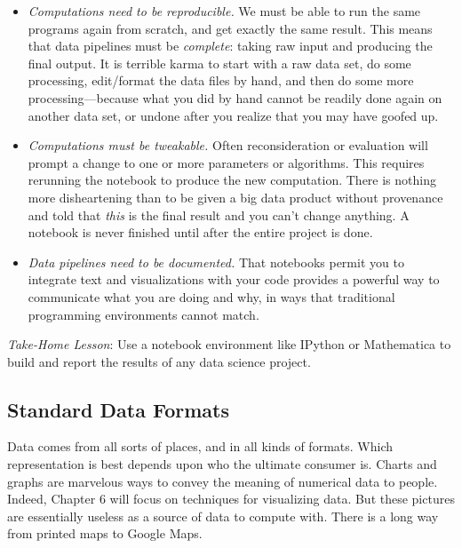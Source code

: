 \documentclass[10pt]{article}
\begin{document}
\begin{itemize}
  \item \textit{Computations need to be reproducible.} We must be able to run the same programs again from scratch, and get exactly the same result. This means that data pipelines must be \textit{complete}: taking raw input and producing the final output. It is terrible karma to start with a raw data set, do some processing, edit/format the data files by hand, and then do some more processing—because what you did by hand cannot be readily done again on another data set, or undone after you realize that you may have goofed up.
  \item \textit{Computations must be tweakable.} Often reconsideration or evaluation will prompt a change to one or more parameters or algorithms. This requires rerunning the notebook to produce the new computation. There is nothing more disheartening than to be given a big data product without provenance and told that \textit{this} is the final result and you can't change anything. A notebook is never finished until after the entire project is done.
  \item \textit{Data pipelines need to be documented.} That notebooks permit you to integrate text and visualizations with your code provides a powerful way to communicate what you are doing and why, in ways that traditional programming environments cannot match.
\end{itemize}

\textit{Take-Home Lesson}: Use a notebook environment like IPython or Mathematica to build and report the results of any data science project.

\subsection{Standard Data Formats}
Data comes from all sorts of places, and in all kinds of formats. Which representation is best depends upon who the ultimate consumer is. Charts and graphs are marvelous ways to convey the meaning of numerical data to people. Indeed, Chapter 6 will focus on techniques for visualizing data. But these pictures are essentially useless as a source of data to compute with. There is a long way from printed maps to Google Maps.
\end{document}
